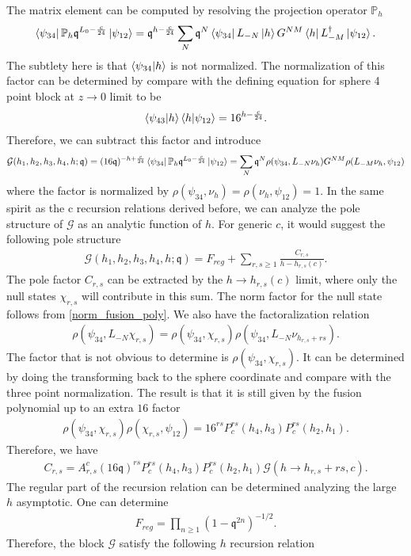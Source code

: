 \documentclass[12pt]{article}
\newcommand{\ie}{\begin{equation}\begin{aligned}}
\newcommand{\fe}{\end{aligned}\end{equation}}
\numberwithin{equation}{section}
\begin{document}
The matrix element can be computed by resolving the projection operator $\mathbb{P}_h$
\ie
\bra{\psi_{34}}\mathbb{P}_h \mathfrak{q}^{L_0-\frac{c}{24}}\ket{\psi_{12}} =\mathfrak{q}^{h-\frac{c}{24}} \sum_{N} \mathfrak{q}^{N} \bra{\psi_{34}} L_{-N}\ket{h}G^{NM} \bra{h}L_{-M}^{\dagger}\ket{\psi_{12}} .
\fe
The subtlety here is that $\bra{\psi_{34}}\ket{h}$ is not normalized. The normalization of this factor can be determined by compare with the defining equation for sphere 4 point block at $z\rightarrow 0$ limit to be 
\ie
\bra{\psi_{43}}\ket{h}\bra{h}\ket{\psi_{12}} =16^{h-\frac{c}{24}}.
\fe
Therefore, we can subtract this factor and introduce
\ie
\mathcal{G}(h_1,h_2,h_3,h_4,h; \mathfrak{q})= (16\mathfrak{q})^{-h+\frac{c}{24}}\bra{\psi_{34}}\mathbb{P}_h \mathfrak{q}^{L_0-\frac{c}{24}}\ket{\psi_{12}} = \sum_{N} \mathfrak{q}^{N} \rho(\psi_{34}, L_{-N}\nu_h) G^{NM} \rho( L_{-M}\nu_h,\psi_{12})
\fe
where the factor is normalized by $\rho(\psi_{34},\nu_h)=\rho(\nu_h,\psi_{12})=1$. In the same spirit as the c recursion relations derived before, we can analyze the pole structure of $\mathcal{G}$ as an analytic function of $h$. For generic $c$, it would suggest the following pole structure
\ie
\mathcal{G}(h_1,h_2,h_3,h_4,h; \mathfrak{q}) = F_{reg}+ \sum_{r,s\geq 1}\frac{C_{r,s}}{h-h_{r,s}(c)}.
\fe
The pole factor $C_{r,s}$ can be extracted by the $h\rightarrow h_{r,s}(c)$ limit, where only the null states $\chi_{r,s}$ will contribute in this sum. The norm factor for the null state follows from \eqref{norm_fusion_poly}. We also have the factoralization relation
\ie
\rho(\psi_{34}, L_{-N}\chi_{r,s}) =\rho(\psi_{34}, \chi_{r,s}) \rho(\psi_{34},L_{-N}\nu_{h_{r,s}+rs}).
\fe
The factor that is not obvious to determine is $\rho(\psi_{34}, \chi_{r,s})$. It can be determined by doing the transforming back to the sphere coordinate and compare with the three point normalization.  The result is that it is still given by the fusion polynomial up to an extra $16$ factor
\ie
\rho(\psi_{34}, \chi_{r,s}) \rho(\chi_{r,s},\psi_{12})= 16^{rs} P_c^{rs}(h_4, h_3)P_c^{rs}(h_2, h_1).
\fe
Therefore, we have 
\ie\label{residue_hrecursion}
C_{r,s}=A_{r,s}^c (16\mathfrak{q})^{rs} P_c^{rs}(h_{4}, h_{3}) P_c^{rs}(h_{2}, h_{1}) \mathcal{G}(h\rightarrow h_{r,s}+rs, c).
\fe
The regular part of the recursion relation can be determined analyzing the large $h$ asymptotic. One can determine
\ie
F_{reg}= \prod_{n\geq 1}(1-\mathfrak{q}^{2n})^{-1/2}.
\fe
{}
Therefore, the block $\mathcal{G}$ satisfy the following $h$ recursion relation
\end{document}
